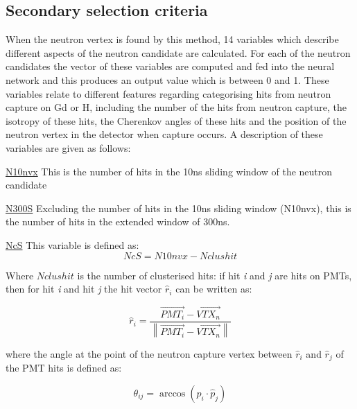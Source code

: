 \subsection{Secondary selection criteria}
When the neutron vertex is found by this method, 14 variables which describe different aspects of the neutron candidate are calculated. For each of the neutron candidates the vector of these variables are computed and fed into the neural network and this produces an output value which is between 0 and 1. These variables relate to different features regarding categorising hits from neutron capture on Gd or H, including the number of the hits from neutron capture, the isotropy of these hits, the Cherenkov angles of these hits and the position of the neutron vertex in the detector when capture occurs. A description of these variables are given as follows:
\newline


\underline{N10nvx}
\newline
This is the number of hits in the 10ns sliding window of the neutron candidate
\newline


\underline{N300S}
\newline
Excluding the number of hits in the 10ns sliding window (N10nvx), this is the number of hits in the extended window of 300ns.
\newline


\underline{NcS}
\newline
This variable is defined as:
\begin{equation}
\label{ncs}
    NcS = N10nvx - Nclushit
\end{equation}

    Where $Nclushit$ is the number of clusterised hits: if hit \textit{i} and \textit{j} are hits on PMTs, then for hit \textit{i} and hit \textit{j} the hit vector $\hat{r}_i$ can be written as:

\begin{equation}
\label{hit}
    \hat{r}_{i}=\frac{\overrightarrow{P M T_{i}}-\overrightarrow{V T X_{n}}}{\left\|\overrightarrow{P M T_{i}}-\overrightarrow{V T X_{n}}\right\|}
\end{equation}

where the angle at the point of the neutron capture vertex between $\hat{r}_{i}$ and $\hat{r}_{j}$ of the PMT hits is defined as:

\begin{equation}
\theta_{i j}=\arccos \left(\hat{p}_{i} \cdot \hat{p}_{j}\right)
\end{equation}

